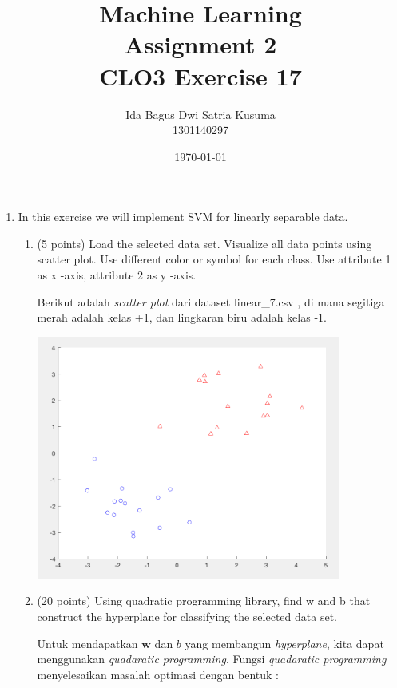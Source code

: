 \documentclass[12pt]{article}%
\begin{document}
\newcommand\scalemath[2]{\scalebox{#1}{\mbox{\ensuremath{\displaystyle #2}}}}
\title{Machine Learning \protect\\ Assignment 2 \protect\\ CLO3 Exercise 17} 
\author{Ida Bagus Dwi Satria Kusuma \protect\\ 1301140297}
\date{\today}
\maketitle

\begin{enumerate}
	\item In this exercise we will implement SVM for linearly separable data.
	\begin{enumerate}
		\item (5 points) Load the selected data set. Visualize all data points using scatter plot. Use different color or symbol for each class. Use attribute 1 as x -axis, attribute 2 as y -axis.

		\par Berikut adalah \textit{scatter plot} dari dataset linear\_7.csv , di mana segitiga merah adalah kelas +1, dan lingkaran biru adalah kelas -1.
		\par \includegraphics[width=10cm]{ass2clo3no17_1} 

		\item (20 points) Using quadratic programming library, find w and b that construct the hyperplane for classifying the selected data set.

		\par Untuk mendapatkan $\textbf{w}$ dan $b$ yang membangun \textit{hyperplane}, kita dapat menggunakan \textit{quadaratic programming}. Fungsi \textit{quadaratic programming} menyelesaikan masalah optimasi dengan bentuk : 


\end{enumerate}
\end{enumerate}
\end{document}
